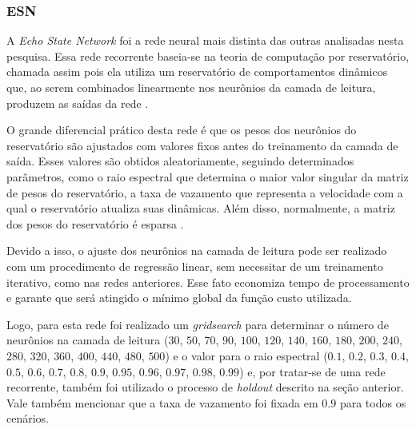 \documentclass{article}
\begin{document}
\subsubsection{ESN}

A \textit{Echo State Network} foi a rede neural mais distinta das outras analisadas nesta pesquisa. Essa rede recorrente baseia-se na teoria de computação por reservatório, chamada assim pois ela utiliza um reservatório de comportamentos dinâmicos que, ao serem combinados linearmente nos neurônios da camada de leitura, produzem as saídas da rede \cite{boccato2013novas}. 

O grande diferencial prático desta rede é que os pesos dos neurônios do reservatório são ajustados com valores fixos antes do treinamento da camada de saída. Esses valores são obtidos aleatoriamente, seguindo determinados parâmetros, como o raio espectral que determina o maior valor singular da matriz de pesos do reservatório,  a taxa de vazamento que representa a velocidade com a qual o reservatório atualiza suas dinâmicas. Além disso, normalmente, a matriz dos pesos do reservatório é esparsa \cite{jaeger2007echo}.

Devido a isso, o ajuste dos neurônios na camada de leitura pode ser realizado com um procedimento de regressão linear, sem necessitar de um treinamento iterativo, como nas redes anteriores. Esse fato economiza tempo de processamento e garante que será atingido o mínimo global da função custo utilizada.

Logo, para esta rede foi realizado um \textit{gridsearch} para determinar o número de neurônios na camada de leitura ($30$, $50$, $70$, $90$, $100$, $120$, $140$, $160$, $180$, $200$, $240$, $280$, $320$, $360$, $400$, $440$, $480$, $500$) e o valor para o raio espectral ($0.1$, $0.2$, $0.3$, $0.4$, $0.5$, $0.6$, $0.7$, $0.8$, $0.9$, $0.95$, $0.96$, $0.97$, $0.98$, $0.99$) e, por tratar-se de uma rede recorrente, também foi utilizado o processo de \textit{holdout} descrito na seção anterior. Vale também mencionar que a taxa de vazamento foi fixada em $0.9$ para todos os cenários.
\end{document}
